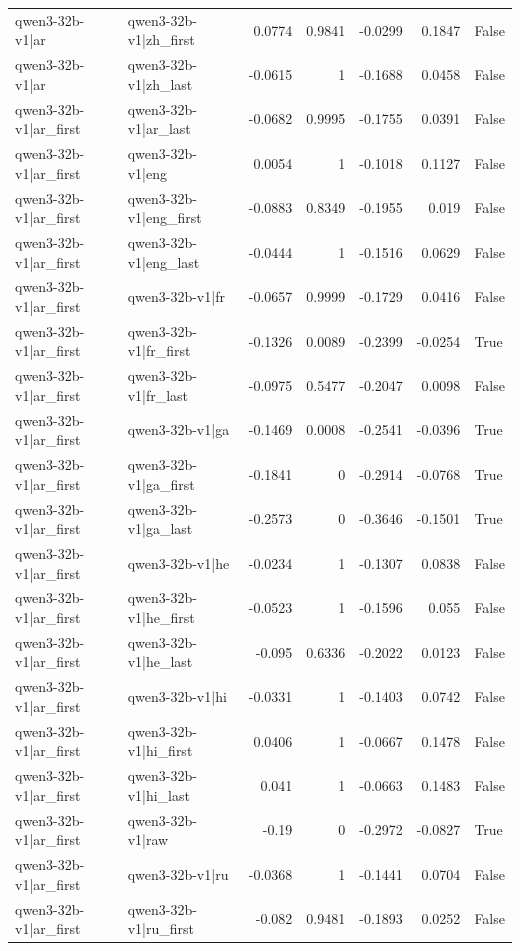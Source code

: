\begin{table}
\begin{tabular}{l l r r r r l}
qwen3-32b-v1|ar & qwen3-32b-v1|zh_first & 0.0774 & 0.9841 & -0.0299 & 0.1847 & False \\
qwen3-32b-v1|ar & qwen3-32b-v1|zh_last & -0.0615 & 1 & -0.1688 & 0.0458 & False \\
qwen3-32b-v1|ar_first & qwen3-32b-v1|ar_last & -0.0682 & 0.9995 & -0.1755 & 0.0391 & False \\
qwen3-32b-v1|ar_first & qwen3-32b-v1|eng & 0.0054 & 1 & -0.1018 & 0.1127 & False \\
qwen3-32b-v1|ar_first & qwen3-32b-v1|eng_first & -0.0883 & 0.8349 & -0.1955 & 0.019 & False \\
qwen3-32b-v1|ar_first & qwen3-32b-v1|eng_last & -0.0444 & 1 & -0.1516 & 0.0629 & False \\
qwen3-32b-v1|ar_first & qwen3-32b-v1|fr & -0.0657 & 0.9999 & -0.1729 & 0.0416 & False \\
qwen3-32b-v1|ar_first & qwen3-32b-v1|fr_first & -0.1326 & 0.0089 & -0.2399 & -0.0254 & True \\
qwen3-32b-v1|ar_first & qwen3-32b-v1|fr_last & -0.0975 & 0.5477 & -0.2047 & 0.0098 & False \\
qwen3-32b-v1|ar_first & qwen3-32b-v1|ga & -0.1469 & 0.0008 & -0.2541 & -0.0396 & True \\
qwen3-32b-v1|ar_first & qwen3-32b-v1|ga_first & -0.1841 & 0 & -0.2914 & -0.0768 & True \\
qwen3-32b-v1|ar_first & qwen3-32b-v1|ga_last & -0.2573 & 0 & -0.3646 & -0.1501 & True \\
qwen3-32b-v1|ar_first & qwen3-32b-v1|he & -0.0234 & 1 & -0.1307 & 0.0838 & False \\
qwen3-32b-v1|ar_first & qwen3-32b-v1|he_first & -0.0523 & 1 & -0.1596 & 0.055 & False \\
qwen3-32b-v1|ar_first & qwen3-32b-v1|he_last & -0.095 & 0.6336 & -0.2022 & 0.0123 & False \\
qwen3-32b-v1|ar_first & qwen3-32b-v1|hi & -0.0331 & 1 & -0.1403 & 0.0742 & False \\
qwen3-32b-v1|ar_first & qwen3-32b-v1|hi_first & 0.0406 & 1 & -0.0667 & 0.1478 & False \\
qwen3-32b-v1|ar_first & qwen3-32b-v1|hi_last & 0.041 & 1 & -0.0663 & 0.1483 & False \\
qwen3-32b-v1|ar_first & qwen3-32b-v1|raw & -0.19 & 0 & -0.2972 & -0.0827 & True \\
qwen3-32b-v1|ar_first & qwen3-32b-v1|ru & -0.0368 & 1 & -0.1441 & 0.0704 & False \\
qwen3-32b-v1|ar_first & qwen3-32b-v1|ru_first & -0.082 & 0.9481 & -0.1893 & 0.0252 & False \\

\end{tabular}
\end{table}
